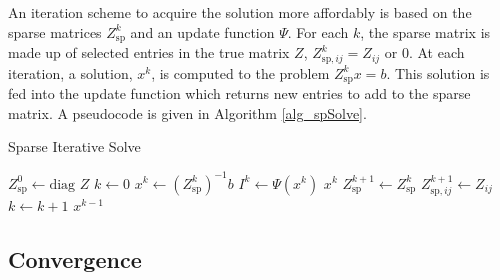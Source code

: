 \documentclass{article}
\theoremstyle{plain}
\begin{document}
An iteration scheme to acquire the solution more affordably is based on the sparse matrices $Z_{\text{sp}}^k$
and an update function $\Psi$.
For each $k$, the sparse matrix is made up of selected entries in the true matrix $Z$, $Z_{\text{sp},ij}^k=Z_{ij}\text{ or }0$.
At each iteration, a solution, $x^k$, is computed to the problem $Z_{\text{sp}}^kx=b$.
This solution is fed into the update function which returns new entries to add to the sparse matrix.
A pseudocode is given in Algorithm \ref{alg_spSolve}.
\begin{algorithm}
\caption{Sparse Iterative Solve}\label{alg_spSolve}
\begin{algorithmic}
\State $Z_{\text{sp}}^0 \gets \text{diag } Z$ 
\State $k \gets 0$
 
	\State $x^k \gets (Z_{\text{sp}}^k)^{-1}b$
	\State $I^k \gets \Psi(x^k)$
	 
		\State\Return $x^k$ 
	\EndIf
	\State $Z_{\text{sp}}^{k+1} \gets Z_{\text{sp}}^k$ 
		\State $Z_{\text{sp},ij}^{k+1} \gets Z_{ij}$
	\EndFor
	\State $k \gets k+1$
\EndWhile
\State\Return $x^{k-1}$
\end{algorithmic}
\end{algorithm}

\subsection{Convergence}
\end{document}
